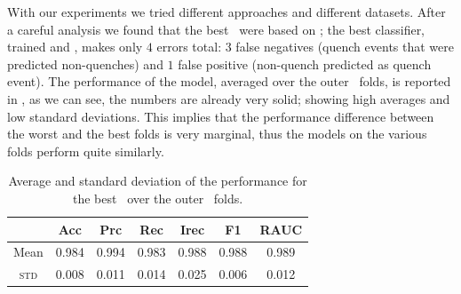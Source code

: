 With our experiments we tried different approaches and different datasets. After a careful analysis
we found that the best \dts\ were based on \an; the best classifier, trained \an[2] and \an[12],
makes only $4$ errors total: $3$ false negatives (quench events that were predicted non-quenches)
and $1$ false positive (non-quench predicted as quench event). The performance of the model,
averaged over the outer \cv\ folds, is reported in , as we can see, the
numbers are already very solid; showing high averages and low standard deviations. This implies that
the performance difference between the worst and the best folds is very marginal, thus the models on
the various folds perform quite similarly.
\begin{table}[!ht]
	\caption{Average and standard deviation of the performance for the best \dt\ over the outer \cv\
		folds.}\label{tbl:an-2-12-perf}

	\bigskip
	\setlength{\tabcolsep}{6pt}
	\centering
	\begin{tabular}{ccccccc}
		\toprule
		\textbf{}    & \textbf{Acc} & \textbf{Prc} & \textbf{Rec} & \textbf{Irec} & \textbf{F1} & \textbf{RAUC} \\
		\midrule
		Mean         & 0.984        & 0.994        & 0.983        & 0.988         & 0.988
		             & 0.989                                                                                    \\
		\textsc{std} & 0.008        & 0.011        & 0.014        & 0.025         & 0.006
		             & 0.012                                                                                    \\
		\bottomrule
	\end{tabular}
\end{table}

